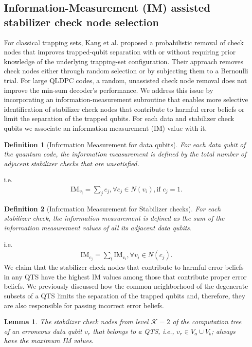 \documentclass[%
 reprint,
 amsmath,amssymb,
 aps,
pra,
showkeys,
]{revtex4-2}
\newtheorem{definition}{Definition}[section]
\newtheorem{lemma}{Lemma}
\begin{document}
\subsection{Information-Measurement (IM) assisted stabilizer check node selection}
For classical trapping sets, Kang et al. \cite{kang2015breaking} proposed a probabilistic removal of check nodes that improves trapped-qubit separation with or without requiring prior knowledge of the underlying trapping-set configuration. Their approach removes check nodes either through random selection or by subjecting them to a Bernoulli trial.
For large QLDPC codes, a random, unassisted check node removal does not improve the min-sum decoder's performance.
We address this issue by incorporating an information-measurement subroutine that enables more selective identification of stabilizer check nodes that contribute to harmful error beliefs or limit the separation of the trapped qubits.
For each data and stabilizer check qubits we associate an information measurement (IM) value with it.
\begin{definition}[Information Measurement for data qubits]
    For each data qubit of the quantum code, the information measurement is defined by the total number of adjacent stabilizer checks that are unsatisfied. 
\end{definition}
i.e. 
\begin{align}
    \mathrm{IM}_{v_i} = \sum_{j}c_j, \forall c_j \in N(v_i), \text{if}\,\, c_j = 1.
    \label{eq:im-qubit}
\end{align}
\begin{definition}[Information Measurement for Stabilizer checks]
    For each stabilizer check, the information measurement is defined as the sum of the information measurement values of all its adjacent data qubits. 
\end{definition}
i.e.
\begin{align}
    \mathrm{IM}_{c_j} = \sum_{i}\mathrm{IM}_{v_i}, \forall v_i \in N(c_j).
    \label{eq:im-check}
\end{align}
We claim that the stabilizer check nodes that contribute to harmful error beliefs in any QTS have the highest IM values among those that contribute proper error beliefs.
We previously discussed how the common neighborhood of the degenerate subsets of a QTS limits the separation of the trapped qubits and, therefore, they are also responsible for passing incorrect error beliefs.
\begin{lemma}
    The stabilizer check nodes from level $\mathcal{K} = 2$ of the computation tree of an erroneous data qubit $v_r$ that belongs to a QTS, i.e., $v_r \in V_a \cup V_b$; always have the maximum IM values.
\end{lemma}
\end{document}
